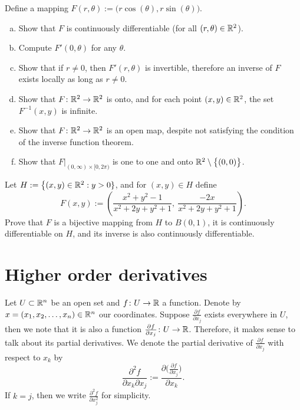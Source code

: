 \begin{exercise} \label{mv:exercise:polarcoordinates}
Define a mapping $F(r,\theta) := \bigl(r \cos(\theta), r \sin(\theta) \bigr)$.
\begin{enumerate}[a)]
\item
Show that $F$ is continuously differentiable (for all $(r,\theta) \in
{\mathbb{R}}^2$).
\item
Compute $F'(0,\theta)$ for any $\theta$.
\item
Show that if $r \not= 0$, then $F'(r,\theta)$ is invertible, therefore an
inverse of $F$ exists locally as long as $r \not= 0$.
\item
Show that $F \colon {\mathbb{R}}^2 \to {\mathbb{R}}^2$ is onto, and for each point $(x,y) \in
{\mathbb{R}}^2$, the set $F^{-1}(x,y)$ is infinite.
\item
Show that $F \colon {\mathbb{R}}^2 \to {\mathbb{R}}^2$ is an open map, despite not satisfying the condition of the
inverse function theorem.
\item
Show that $F|_{(0,\infty) \times [0,2\pi)}$ is one to one and onto
${\mathbb{R}}^2 \setminus \bigl\{ (0,0) \bigr\}$.
\end{enumerate}
\end{exercise}

\begin{exercise}
Let $H := \bigl\{ (x,y) \in {\mathbb{R}}^2 : y > 0 \}$, and for $(x,y) \in H$
define
\begin{equation*}
F(x,y) := \left(
\frac{x^2+y^2-1}{x^2+2y+y^2+1}
,~
\frac{-2x}{x^2+2y+y^2+1}
\right) .
\end{equation*}
Prove that $F$ is a bijective mapping from $H$ to $B(0,1)$, it is
continuously differentiable on $H$, and its inverse is also continuously
differentiable.
\end{exercise}


\sectionnewpage
\section{Higher order derivatives}
\label{sec:mvhighordders}


Let $U \subset {\mathbb{R}}^n$ be an open set and $f \colon U \to {\mathbb{R}}$ a function.
Denote by $x = (x_1,x_2,\ldots,x_n) \in {\mathbb{R}}^n$ our coordinates.
Suppose $\frac{\partial f}{\partial x_j}$ exists everywhere in $U$,
then we note that it is also a function $\frac{\partial f}{\partial x_j}
\colon U \to {\mathbb{R}}$.  Therefore, it makes sense to talk about its partial
derivatives.  We denote 
the partial derivative of $\frac{\partial f}{\partial x_j}$ with respect to
$x_k$ by
\begin{equation*}
\frac{\partial^2 f}{\partial x_k \partial x_j}
:=
\frac{\partial \bigl( \frac{\partial f}{\partial x_j} \bigr)}{\partial x_k} .
\end{equation*}
If $k=j$, then we write 
$\frac{\partial^2 f}{\partial x_j^2}$ for simplicity.

